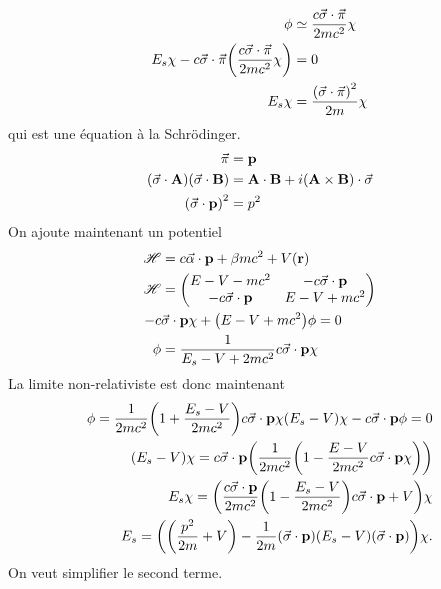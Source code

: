 \begin{align}
    \phi&\simeq\frac{c\va{\sigma}\cdot\va{\pi}}{2mc^2}\chi\\
    E_s\chi-c\va{\sigma}\cdot\va{\pi}\qty(\frac{c\va{\sigma}\cdot\va{\pi}}{2mc^2}\chi)&=0\\
    E_s\chi&=\frac{\qty(\va{\sigma}\cdot\va{\pi})^2}{2m}\chi
\end{align}
qui est une équation à la Schrödinger.
\begin{align}
    \va{\pi}&=\vb{p}\\
    \qty(\va{\sigma}\cdot\vb{A})\qty(\va{\sigma}\cdot\vb{B})
            &=\vb{A}\cdot\vb{B}+i\qty(\vb{A}\times\vb{B})\cdot\va{\sigma}\\
    \qty(\va{\sigma}\cdot\vb{p})^2&=p^2
\end{align}
On ajoute maintenant un potentiel
\begin{align}
    \mathscr{H}&=c\va{\alpha}\cdot\vb{p}+\beta mc^2+V(\vb{r})\\
    \mathscr{H}&=
    \begin{pmatrix}
        E-V-mc^2 & -c\va{\sigma}\cdot\vb{p}\\
        -c\va{\sigma}\cdot\vb{p} & E-V+mc^2\\
    \end{pmatrix}\\
    -c&\va{\sigma}\cdot\vb{p}\chi+\qty(E-V+mc^2)\phi=0\\
    \phi&=\frac{1}{E_s-V+2mc^2}c\va{\sigma}\cdot\vb{p}\chi
\end{align}
La limite non-relativiste est donc maintenant
\begin{align}
    \phi=\frac1{2mc^2}\qty(1+\frac{E_s-V}{2mc^2})c\va{\sigma}\cdot\vb{p}\chi
    \qty(E_s-V)\chi-c\va{\sigma}\cdot\vb{p}\phi=0\\
    (E_s-V)\chi=c\va{\sigma}\cdot\vb{p}\qty(\frac1{2mc^2}\qty(1-\frac{E-V}{2mc^2}
    c\va{\sigma}\cdot\vb{p}\chi))\\
    E_s\chi=\qty(\frac{c\va{\sigma}\cdot\vb{p}}{2mc^2}\qty(1-\frac{E_s-V}{2mc^2})
    c\va{\sigma}\cdot\vb{p}+V)\chi\\
    E_s=\qty(\qty(\frac{p^2}{2m}+V)-\frac1{2m}(\va{\sigma}\cdot\vb{p})(E_s-V)(\va{\sigma}
    \cdot\vb{p}))\chi.
\end{align}
On veut simplifier le second terme.
